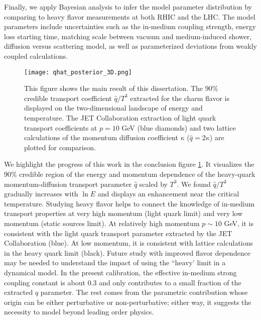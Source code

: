 Finally, we apply Bayesian analysis to infer the model parameter distribution by comparing to heavy flavor measurements at both RHIC and the LHC.
The model parameters include uncertainties such as the in-medium coupling strength, energy loss starting time, matching scale between vacuum and medium-induced shower, diffusion versus scattering model, as well as parameterized deviations from weakly coupled calculations.

\begin{figure}
\singlespacing
\centering
\texttt{[image: qhat\_posterior\_3D.png]}
\caption[This figure shows the main result of this dissertation. The 90\%]{This figure shows the main result of this dissertation. The 90\% credible transport coefficient $\hat{q}/T^3$ extracted for the charm flavor is displayed on the two-dimensional landscape of energy and temperature. The JET Collaboration extraction of light quark transport coefficients at $p=10$ GeV \cite{Burke:2013yra} (blue diamonds) and two lattice calculations of the momentum diffusion coefficient $\kappa$ ($\hat{q}=2\kappa$) \cite{Ding:2012sp,Banerjee:2011ra} are plotted for comparison.}
\label{fig:conclusion}
\end{figure}

We highlight the progress of this work in the conclusion figure \ref{fig:conclusion}.
It visualizes the $90\%$ credible region of the energy and momentum dependence of the heavy-quark momentum-diffusion transport parameter $\hat{q}$ scaled by $T^3$.
We found $\hat{q}/T^3$ gradually increases with $\ln E$ and displays an enhancement near the critical temperature.
Studying heavy flavor helps to connect the knowledge of in-medium transport properties at very high momentum (light quark limit) and very low momentum (static sources limit).
At relatively high momentum $p\sim 10$ GeV, it is consistent with the light quark transport parameter extracted by the JET Collaboration (blue).
At low momentum, it is consistent with lattice calculations in the heavy quark limit (black).
Future study with improved flavor dependence may be needed to understand the impact of using the ``heavy' limit in a dynamical model.
In the present calibration, the effective in-medium strong coupling constant is about $0.3$ and only contributes to a small fraction of the extracted $\hat{q}$ parameter.
The rest comes from the parametric contribution whose origin can be either perturbative or non-perturbative; either way, it suggests the necessity to model beyond leading order physics.

